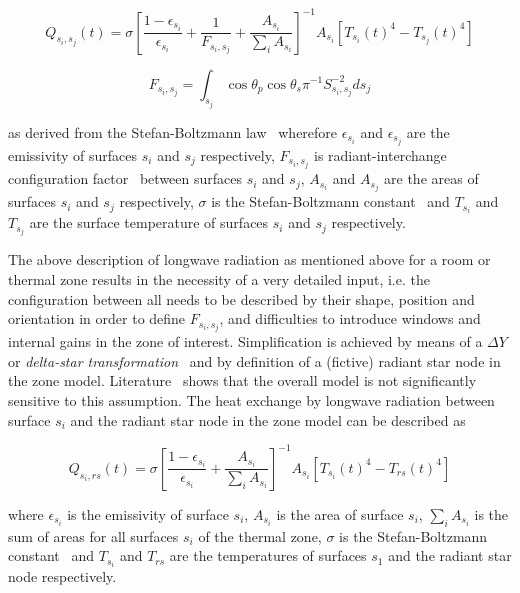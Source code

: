 \begin{equation}
Q_{s_{i},s_{j}}(t)=\sigma \left[\frac{1-\epsilon_{s_{i}}}{\epsilon_{s_{i}}} + \frac{1}{F_{s_{i},s_{j}}} + \frac{A_{s_{i}}}{\sum_{i} A_{s_{i}}}\right]^{-1} A_{s_{i}}\left[T_{s_{i}}(t)^{4}-T_{s_{j}}(t)^{4}\right]
\end{equation}

\begin{equation}
F_{s_{i},s_{j}} = \int_{s_{j}} \cos \theta_{p} \cos \theta_{s} \pi^{-1} S_{s_{i},s_{j}}^{-2} ds_{j}
\end{equation}

as derived from the Stefan-Boltzmann law~\cite{Stefan1879,Boltzmann1884} wherefore $\epsilon_{s_{i}}$ and $\epsilon_{s_{j}}$ are the emissivity of surfaces $s_{i}$ and $s_{j}$ respectively, $F_{s_{i},s_{j}}$ is radiant-interchange configuration factor~\cite{Hamilton1952} between surfaces $s_{i}$ and $s_{j}$, $A_{s_{i}}$ and $A_{s_{j}}$ are the areas of surfaces $s_{i}$ and $s_{j}$ respectively, $\sigma$ is the Stefan-Boltzmann constant~\cite{Mohr2008} and $T_{s_{i}}$ and $T_{s_{j}}$ are the surface temperature of surfaces $s_{i}$ and $s_{j}$ respectively. 

The above description of longwave radiation as mentioned above for a room or thermal zone results in the necessity of a very detailed input, i.e. the configuration between all needs to be described by their shape, position and orientation in order to define $F_{s_{i},s_{j}}$, and difficulties to introduce windows and internal gains in the zone of interest. Simplification is achieved by means of a $\Delta Y$ or \emph{delta-star transformation}~\cite{Kenelly1899} and by definition of a (fictive) radiant star node in the zone model. Literature~\cite{Liesen1997} shows that the overall model is not significantly sensitive to this assumption. The heat exchange by longwave radiation between surface $s_{i}$ and the radiant star node in the zone model can be described as

\begin{equation}
Q_{s_{i},rs}(t)=\sigma \left[\frac{1-\epsilon_{s_{i}}}{\epsilon_{s_{i}}} + \frac{A_{s_{i}}}{\sum_{i} A_{s_{i}}}\right]^{-1} A_{s_{i}}\left[T_{s_{i}}(t)^{4}-T_{rs}(t)^{4}\right]
\end{equation}

where $\epsilon_{s_{i}}$ is the emissivity of surface $s_{i}$, $A_{s_{i}}$ is the area of surface $s_{i}$, $\sum_{i}A_{s_{i}}$ is the sum of areas for all surfaces $s_{i}$ of the thermal zone, $\sigma$ is the Stefan-Boltzmann constant~\cite{Mohr2008} and $T_{s_{i}}$ and $T_{rs}$ are the temperatures of surfaces $s_{1}$ and the radiant star node  respectively. 

